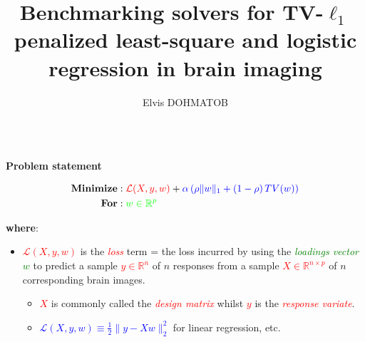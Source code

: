 \documentclass[french]{STIC_poster}
\title{Benchmarking solvers for TV-$\ell_1$ penalized least-square and logistic regression in brain imaging}			%
\author{Elvis DOHMATOB}						%
\begin{document}
	\begin{frame}[t]
		\begin{columns}[t]
			\hfill
			\begin{column}{.48\linewidth}
				\begin{sxbox}[\textwidth]{\textbf{Problem statement}}
                                  \begin{notitlebox}[\textwidth]
                                    \begin{equation}
                                      \begin{split}
                                        \textbf{Minimize} &: \textcolor{red}{\mathcal{L}(X,y,w)} + \textcolor{blue}{\alpha \left(\rho \|w\|_1 + \left(1-\rho\right)TV(w)\right)}\\
                                        \textbf{For} &: \textcolor{green}{w\in\mathbb{R}^p}
                                        \label{eq:opt_pb}
                                      \end{split}
                                    \end{equation}
                                  \end{notitlebox}
                                  \textbf{where}:
                                  \begin{itemize}
                                    \item \textcolor{red}{$\mathcal{L}(X,y,w)$} is the \textcolor{red}{\textit{loss}} term = the loss incurred by using the
                                      \textcolor{green}{\textit{loadings vector} $w$} to predict a sample \textcolor{red}{$y\in\mathbb{R}^n$} of $n$
                                      responses from a sample \textcolor{red}{$X\in\mathbb{R}^{n \times p}$} of $n$ corresponding brain images.
                                      \begin{itemize}
                                        \item \textcolor{red}{$X$} is commonly called the \textcolor{red}{\textit{design matrix}} whilst \textcolor{red}{$y$}
                                          is the \textcolor{red}{\textit{response variate}}. \item \textcolor{blue}{$\mathcal{L}(X,y,w) \equiv \frac{1}{2}\|y-Xw\|_2^2$} for linear regression, etc.

\end{itemize}
\end{itemize}
\end{sxbox}
\end{column}
\end{columns}
\end{frame}
\end{document}

